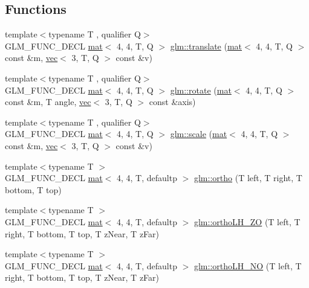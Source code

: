 \subsection*{Functions}
\begin{DoxyCompactItemize}
\item 
{\footnotesize template$<$typename T , qualifier Q$>$ }\\G\+L\+M\+\_\+\+F\+U\+N\+C\+\_\+\+D\+E\+CL \hyperlink{structglm_1_1mat}{mat}$<$ 4, 4, T, Q $>$ \hyperlink{group__gtc__matrix__transform_ga1a4ecc4ad82652b8fb14dcb087879284}{glm\+::translate} (\hyperlink{structglm_1_1mat}{mat}$<$ 4, 4, T, Q $>$ const \&m, \hyperlink{structglm_1_1vec}{vec}$<$ 3, T, Q $>$ const \&v)
\item 
{\footnotesize template$<$typename T , qualifier Q$>$ }\\G\+L\+M\+\_\+\+F\+U\+N\+C\+\_\+\+D\+E\+CL \hyperlink{structglm_1_1mat}{mat}$<$ 4, 4, T, Q $>$ \hyperlink{group__gtc__matrix__transform_gaee9e865eaa9776370996da2940873fd4}{glm\+::rotate} (\hyperlink{structglm_1_1mat}{mat}$<$ 4, 4, T, Q $>$ const \&m, T angle, \hyperlink{structglm_1_1vec}{vec}$<$ 3, T, Q $>$ const \&axis)
\item 
{\footnotesize template$<$typename T , qualifier Q$>$ }\\G\+L\+M\+\_\+\+F\+U\+N\+C\+\_\+\+D\+E\+CL \hyperlink{structglm_1_1mat}{mat}$<$ 4, 4, T, Q $>$ \hyperlink{group__gtc__matrix__transform_ga05051adbee603fb3c5095d8cf5cc229b}{glm\+::scale} (\hyperlink{structglm_1_1mat}{mat}$<$ 4, 4, T, Q $>$ const \&m, \hyperlink{structglm_1_1vec}{vec}$<$ 3, T, Q $>$ const \&v)
\item 
{\footnotesize template$<$typename T $>$ }\\G\+L\+M\+\_\+\+F\+U\+N\+C\+\_\+\+D\+E\+CL \hyperlink{structglm_1_1mat}{mat}$<$ 4, 4, T, defaultp $>$ \hyperlink{group__gtc__matrix__transform_gae5b6b40ed882cd56cd7cb97701909c06}{glm\+::ortho} (T left, T right, T bottom, T top)
\item 
{\footnotesize template$<$typename T $>$ }\\G\+L\+M\+\_\+\+F\+U\+N\+C\+\_\+\+D\+E\+CL \hyperlink{structglm_1_1mat}{mat}$<$ 4, 4, T, defaultp $>$ \hyperlink{group__gtc__matrix__transform_gab37ac3eec8d61f22fceda7775e836afa}{glm\+::ortho\+L\+H\+\_\+\+ZO} (T left, T right, T bottom, T top, T z\+Near, T z\+Far)
\item 
{\footnotesize template$<$typename T $>$ }\\G\+L\+M\+\_\+\+F\+U\+N\+C\+\_\+\+D\+E\+CL \hyperlink{structglm_1_1mat}{mat}$<$ 4, 4, T, defaultp $>$ \hyperlink{group__gtc__matrix__transform_ga526416735ea7c5c5cd255bf99d051bd8}{glm\+::ortho\+L\+H\+\_\+\+NO} (T left, T right, T bottom, T top, T z\+Near, T z\+Far)

\end{DoxyCompactItemize}
